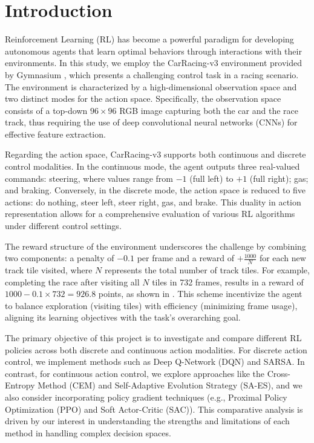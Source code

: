 \documentclass[../CSC_52081_EP.tex]{subfiles}
\begin{document}
    \section{Introduction}
    \label{sec:intro}

Reinforcement Learning (RL) has become a powerful paradigm for developing autonomous agents that learn optimal behaviors through interactions with their environments. In this study, we employ the CarRacing-v3 environment provided by Gymnasium \cite{gymnasium}, which presents a challenging control task in a racing scenario. The environment is characterized by a high-dimensional observation space and two distinct modes for the action space. Specifically, the observation space consists of a top-down \(96\times96\) RGB image capturing both the car and the race track, thus requiring the use of deep convolutional neural networks (CNNs) for effective feature extraction.

Regarding the action space, CarRacing-v3 supports both continuous and discrete control modalities. In the continuous mode, the agent outputs three real-valued commands: steering, where values range from \(-1\) (full left) to \(+1\) (full right); gas; and braking. Conversely, in the discrete mode, the action space is reduced to five actions: do nothing, steer left, steer right, gas, and brake. This duality in action representation allows for a comprehensive evaluation of various RL algorithms under different control settings.

The reward structure of the environment underscores the challenge by combining two components: a penalty of \(-0.1\) per frame and a reward of \(+\frac{1000}{N}\) for each new track tile visited, where \(N\) represents the total number of track tiles. For example, completing the race after visiting all \(N\) tiles in 732 frames, results in a reward of \(1000 - 0.1 \times 732 = 926.8\) points, as shown in \cite{gymnasium}. This scheme incentivize the agent to balance exploration (visiting tiles) with efficiency (minimizing frame usage), aligning its learning objectives with the task's overarching goal.

The primary objective of this project is to investigate and compare different RL policies across both discrete and continuous action modalities. For discrete action control, we implement methods such as Deep Q-Network (DQN) and SARSA. In contrast, for continuous action control, we explore approaches like the Cross-Entropy Method (CEM) and Self-Adaptive Evolution Strategy (SA-ES), and we also consider incorporating policy gradient techniques (e.g., Proximal Policy Optimization (PPO) and Soft Actor-Critic (SAC)). This comparative analysis is driven by our interest in understanding the strengths and limitations of each method in handling complex decision spaces.
\end{document}
